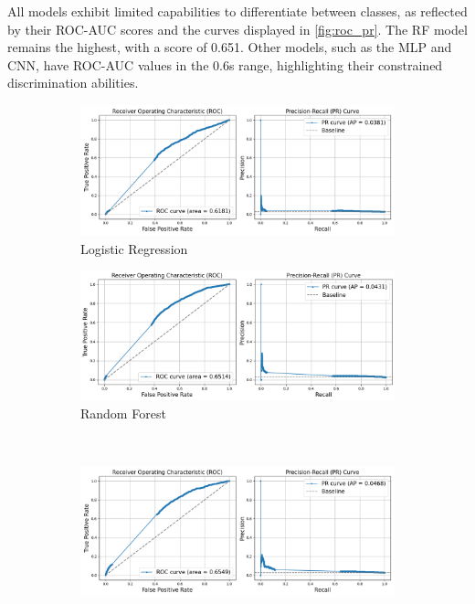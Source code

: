 \documentclass[a4paper,11pt]{report}
\begin{document}
All models exhibit limited capabilities to differentiate between classes, as reflected by their ROC-AUC scores and the curves displayed in \ref{fig:roc_pr}. The RF model remains the highest, with a score of 0.651. Other models, such as the MLP and CNN, have ROC-AUC values in the 0.6s range, highlighting their constrained discrimination abilities.

\begin{figure}[H]
\centering
\begin{subfigure}[b]{0.45\textwidth} %
    \includegraphics[width=\textwidth]{images/LG_S3_zero_Curves.png}
    \caption{Logistic Regression}
    \label{fig:roc_pr_lr}
\end{subfigure}
\hfill
\begin{subfigure}[b]{0.45\textwidth} %
    \includegraphics[width=\textwidth]{images/roc_pr_rf.png}
    \caption{Random Forest}
    \label{fig:roc_pr_rf}
\end{subfigure}
\\ %
\begin{subfigure}[b]{0.45\textwidth} %
    \includegraphics[width=\textwidth]{images/MLP_S3_neg_Curves.png}

\end{subfigure}
\end{figure}
\end{document}
